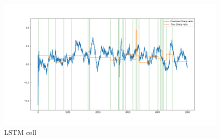\begin{figure}[ht]
\centering
\includegraphics[scale=0.45]{figures/rolling_sharp_prediction_simulated.png}
\caption{LSTM cell}
\label{fig:rollingsharptest}
\end{figure}
